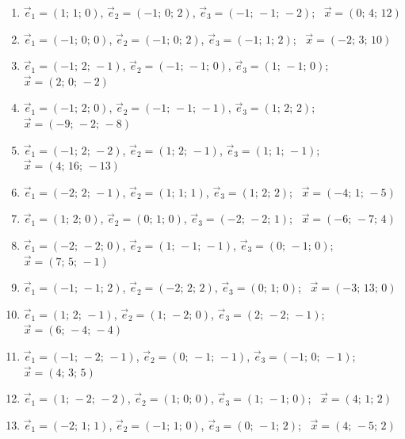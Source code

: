 \begin{enumerate}[label=\arabic*., leftmargin=*]
\item $\vec e_1=(1;\,1;\,0)$, $\vec e_2=(-1;\,0;\,2)$, $\vec e_3=(-1;\,-1;\,-2)$; \ $\vec x=(0;\,4;\,12)$
\item $\vec e_1=(-1;\,0;\,0)$, $\vec e_2=(-1;\,0;\,2)$, $\vec e_3=(-1;\,1;\,2)$; \ $\vec x=(-2;\,3;\,10)$
\item $\vec e_1=(-1;\,2;\,-1)$, $\vec e_2=(-1;\,-1;\,0)$, $\vec e_3=(1;\,-1;\,0)$; \ $\vec x=(2;\,0;\,-2)$
\item $\vec e_1=(-1;\,2;\,0)$, $\vec e_2=(-1;\,-1;\,-1)$, $\vec e_3=(1;\,2;\,2)$; \ $\vec x=(-9;\,-2;\,-8)$
\item $\vec e_1=(-1;\,2;\,-2)$, $\vec e_2=(1;\,2;\,-1)$, $\vec e_3=(1;\,1;\,-1)$; \ $\vec x=(4;\,16;\,-13)$
\item $\vec e_1=(-2;\,2;\,-1)$, $\vec e_2=(1;\,1;\,1)$, $\vec e_3=(1;\,2;\,2)$; \ $\vec x=(-4;\,1;\,-5)$
\item $\vec e_1=(1;\,2;\,0)$, $\vec e_2=(0;\,1;\,0)$, $\vec e_3=(-2;\,-2;\,1)$; \ $\vec x=(-6;\,-7;\,4)$
\item $\vec e_1=(-2;\,-2;\,0)$, $\vec e_2=(1;\,-1;\,-1)$, $\vec e_3=(0;\,-1;\,0)$; \ $\vec x=(7;\,5;\,-1)$
\item $\vec e_1=(-1;\,-1;\,2)$, $\vec e_2=(-2;\,2;\,2)$, $\vec e_3=(0;\,1;\,0)$; \ $\vec x=(-3;\,13;\,0)$
\item $\vec e_1=(1;\,2;\,-1)$, $\vec e_2=(1;\,-2;\,0)$, $\vec e_3=(2;\,-2;\,-1)$; \ $\vec x=(6;\,-4;\,-4)$
\item $\vec e_1=(-1;\,-2;\,-1)$, $\vec e_2=(0;\,-1;\,-1)$, $\vec e_3=(-1;\,0;\,-1)$; \ $\vec x=(4;\,3;\,5)$
\item $\vec e_1=(1;\,-2;\,-2)$, $\vec e_2=(1;\,0;\,0)$, $\vec e_3=(1;\,-1;\,0)$; \ $\vec x=(4;\,1;\,2)$
\item $\vec e_1=(-2;\,1;\,1)$, $\vec e_2=(-1;\,1;\,0)$, $\vec e_3=(0;\,-1;\,2)$; \ $\vec x=(4;\,-5;\,2)$
\end{enumerate}

